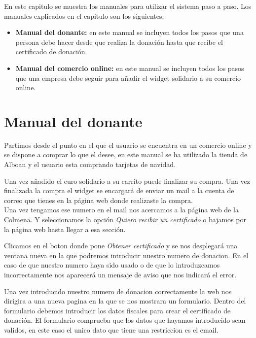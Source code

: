 En este capitulo se muestra los manuales para utilizar el sistema paso a paso. Los manuales explicados en el capitulo son los siguientes:

\begin{itemize}
	\item \textbf{Manual del donante:} en este manual se incluyen todos los pasos que una persona debe hacer desde que realiza la donación hasta que recibe el certificado de donación.
	\item \textbf{Manual del comercio online:} en este manual se incluyen todos los pasos que una empresa debe seguir para añadir el widget solidario a su comercio online.
\end{itemize}

\section{Manual del donante}
Partimos desde el punto en el que el usuario se encuentra en un comercio online y se dispone a comprar lo que el desee, en este manual se ha utilizado la tienda de Alboan y el usuario esta comprando tarjetas de navidad. 


Una vez añadido el euro solidario a su carrito puede finalizar su compra. Una vez finalizada la compra el widget se encargará de enviar un mail a la cuenta de correo que tienes en la página web donde realizaste la compra. \\

Una vez tengamos ese numero en el mail nos acercamos a la página web de la Colmena. Y seleccionamos la opción \textit{Quiero recibir un certificado} o bajamos por la página web hasta llegar a esa sección.\\


Clicamos en el boton donde pone \textit{Obtener certificado} y se nos desplegará una ventana nueva en la que podremos introducir nuestro numero de donacion. En el caso de que nuestro numero haya sido usado o de que lo introduzcamos incorrectamente nos aparecerá un mensaje de aviso que nos indicará el error. \\


Una vez introducido nuestro numero de donacion correctamente la web nos dirigira a una nueva pagina en la que se nos mostrara un formulario. Dentro del formulario debemos introducir los datos fiscales para crear el certificado de donación. El formulario comprueba que los datos que hayamos introducido sean validos, en este caso el unico dato que tiene una restriccion es el email. \\


